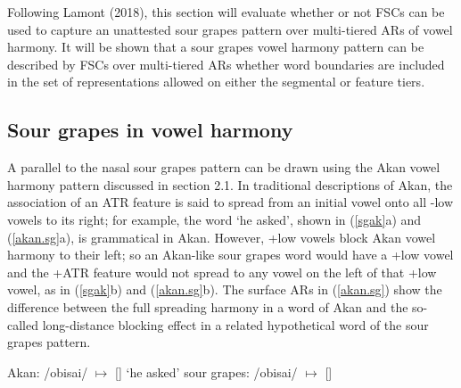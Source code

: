 \documentclass[,doc,floatsintext]{apa6}
\theoremstyle{definition}
\theoremstyle{definition}
\theoremstyle{definition}
\theoremstyle{remark}
\begin{document}
Following Lamont (2018), this section will evaluate whether or not FSCs
can be used to capture an unattested sour grapes pattern over
multi-tiered ARs of vowel harmony. It will be shown that a sour grapes
vowel harmony pattern can be described by FSCs over multi-tiered ARs
whether word boundaries are included in the set of representations
allowed on either the segmental or feature tiers.

\subsection{Sour grapes in vowel
harmony}\label{sour-grapes-in-vowel-harmony}

A parallel to the nasal sour grapes pattern can be drawn using the Akan
vowel harmony pattern discussed in section 2.1. In traditional
descriptions of Akan, the association of an ATR feature is said to
spread from an initial vowel onto all -low vowels to its right; for
example, the word \emph{} `he asked', shown in
(\ref{sgak}a) and (\ref{akan.sg}a), is grammatical in Akan. However,
+low vowels block Akan vowel harmony to their left; so an Akan-like sour
grapes word would have a +low vowel and the +ATR feature would not
spread to any vowel on the left of that +low vowel, as in (\ref{sgak}b)
and (\ref{akan.sg}b). The surface ARs in (\ref{akan.sg}) show the
difference between the full spreading harmony in a word of Akan and the
so-called long-distance blocking effect in a related hypothetical word
of the sour grapes pattern.

\begin{exe}
\label{sgak} 
\begin{xlist}
  \ex Akan: /obisai/ $\mapsto$ [] `he asked'
  \ex sour grapes: /obisai/ $\mapsto$ []
\end{xlist}
\end{exe}\newpage
\end{document}
